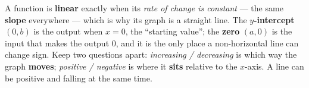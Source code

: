 \documentclass[10pt]{article}
\begin{document}
\vspace{0.10in}

\begin{remindbox}
\small A function is \textbf{linear} exactly when its \emph{rate of change is constant} --- the same
\textbf{slope} everywhere --- which is why its graph is a straight line. The \textbf{$y$-intercept}
$(0,b)$ is the output when $x=0$, the ``starting value''; the \textbf{zero} $(a,0)$ is the input
that makes the output $0$, and it is the only place a non-horizontal line can change sign. Keep two
questions apart: \emph{increasing / decreasing} is which way the graph \textbf{moves};
\emph{positive / negative} is where it \textbf{sits} relative to the $x$-axis. A line can be positive
and falling at the same time.
\end{remindbox}
\end{document}
